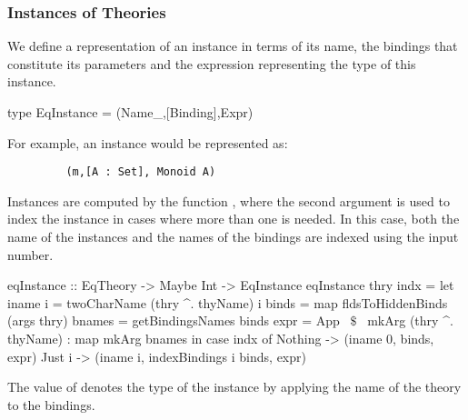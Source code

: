 \begin{comment}
This is done using the function \lstmath{recordToEqTheory}. 
\begin{hscode}
recordToEqTheory :: TRecord -> Eq.EqTheory
recordToEqTheory record@(TRecord nm params _) =
  Eq.build (nm^.name) 
    (getRecordSort record)
    (getRecordComps isFunc record)
    (getRecordComps isAxiom record)
    (paramsNum params)
\end{hscode}
In Tog, records definitions are declared using the \lstmath{Record} constructor of the type \lstmath{Decl}, which contains many other constructors used to define functions, types, and others. We prefer to use a type dedicated to records, and therefore use the \lstmath{TRecord} type instead. \lstmath{TRecord} has the exact same parameters as the \lstmath{Record} constructor. 
\end{comment}

\subsubsection*{Instances of Theories}
\label{sec:instances_theories}
We define a representation of an instance in terms of its name, the bindings that constitute its parameters and the expression representing the type of this instance. 
\begin{hscode}
type EqInstance = (Name_,[Binding],Expr) 
\end{hscode}
\noindent For example, an instance  would be represented as: 
\begin{lstlisting} 
         (m,[A : Set], Monoid A)
\end{lstlisting} 

Instances are computed by the function , where the second argument is used to index the instance in cases where more than one is needed. In this case, both the name of the instances and the names of the bindings are indexed using the input number. 
\begin{hscode} 
eqInstance :: EqTheory -> Maybe Int -> EqInstance
eqInstance thry indx =
  let iname i = twoCharName (thry ^. thyName) i 
      binds = map fldsToHiddenBinds (args thry)
      bnames = getBindingsNames binds
      expr = App ~$\$$~ mkArg (thry ^. thyName) : map mkArg bnames
   in case indx of
    Nothing -> (iname 0, binds, expr)
    Just i  -> (iname i, indexBindings i binds, expr)
\end{hscode}
\noindent The value of  denotes the type of the instance by applying the name of the theory to the bindings. 

